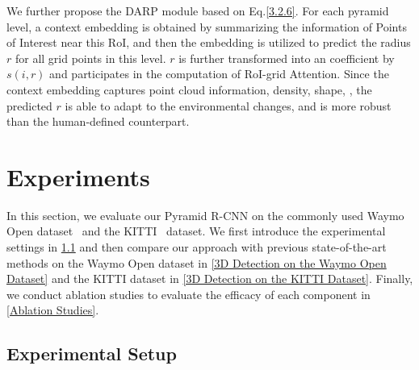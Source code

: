\documentclass[10pt,twocolumn,letterpaper]{article}
\begin{document}
We further propose the DARP module based on Eq.\ref{3.2.6}. For each pyramid level, a context embedding is obtained by summarizing the information of Points of Interest near this RoI, and then the embedding is utilized to predict the radius $r$ for all grid points in this level. $r$ is further transformed into an coefficient by $s(i, r)$ and participates in the computation of RoI-grid Attention. Since the context embedding captures point cloud information, \ie density, shape, \etc, the predicted $r$ is able to adapt to the environmental changes, and is more robust than the human-defined counterpart.

\section{Experiments}
In this section, we evaluate our Pyramid R-CNN on the commonly used Waymo Open dataset~\cite{sun2020scalability} and the KITTI~\cite{geiger2013vision} dataset. We first introduce the experimental settings in \ref{Experimental Setup} and then compare our approach with previous state-of-the-art methods on the Waymo Open dataset in \ref{3D Detection on the Waymo Open Dataset} and the KITTI dataset in \ref{3D Detection on the KITTI Dataset}. Finally, we conduct ablation studies to evaluate the efficacy of each component in \ref{Ablation Studies}.

\subsection{Experimental Setup} \label{Experimental Setup}
\end{document}
